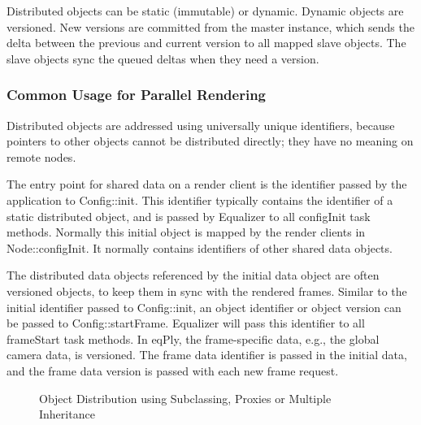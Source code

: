 \documentclass[10pt,a4]{scrartcl}
\begin{document}
Distributed objects can be static (immutable) or dynamic. Dynamic objects are
versioned. New versions are committed from the master instance, which sends
the delta between the previous and current version to all mapped slave
objects. The slave objects sync the queued deltas when they need a version.

\subsubsection{Common Usage for Parallel Rendering}

Distributed objects are addressed using universally unique identifiers, because
pointers to other objects cannot be distributed directly; they have no meaning
on remote nodes.

The entry point for shared data on a render client is the identifier passed by
the application to \textsf{Config::init}. This identifier typically contains the
identifier of a static distributed object, and is passed by Equalizer to all
\textsf{configInit} task methods. Normally this initial object is mapped by the
render clients in \textsf{Node::configInit}. It normally contains identifiers of
other shared data objects.

The distributed data objects referenced by the initial data object are
often versioned objects, to keep them in sync with the rendered
frames. Similar to the initial identifier passed to
\textsf{Config::init}, an object identifier or object version can be
passed to \textsf{Config::startFrame}. Equalizer will pass this
identifier to all \textsf{frameStart} task methods. In \textsf{eqPly},
the frame-specific data, e.g., the global camera data, is versioned. The
frame data identifier is passed in the initial data, and the frame data
version is passed with each new frame request.

\begin{figure}[h!t]
  \hfil
  \hfil
  {\caption{\label{fObjectDist}Object Distribution using Subclassing,
      Proxies or Multiple Inheritance}}
\end{figure}
\end{document}
